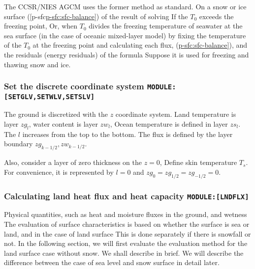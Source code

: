 The CCSR/NIES AGCM uses the former method as standard. On a snow or ice
surface
({[}p-sfc\protect\hyperlink{p-sfc:ux5cux2520sfc-balance}{p-sfc:sfc-balance{]}})
of the result of solving If the \(T_0\) exceeds the freezing point, Or,
when \(T_0\) divides the freezing temperature of seawater at the sea
surface (in the case of oceanic mixed-layer model) by fixing the
temperature of the \(T_0\) at the freezing point and calculating each
flux, (\protect\hyperlink{p-sfc:sfc-balance}{p-sfc:sfc-balance{]}}), and
the residuals (energy residuals) of the formula Suppose it is used for
freezing and thawing snow and ice.

\hypertarget{set-the-discrete-coordinate-system-modulesetglvsetwlvsetslv}{%
\subsubsection{\texorpdfstring{Set the discrete coordinate system
\texttt{MODULE:{[}SETGLV,SETWLV,SETSLV{]}}}{Set the discrete coordinate system MODULE:{[}SETGLV,SETWLV,SETSLV{]}}}\label{set-the-discrete-coordinate-system-modulesetglvsetwlvsetslv}}

The ground is discretized with the \(z\) coordinate system. Land
temperature is layer \(zg_l\), water content is layer \(zw_l\), Ocean
temperature is defined in layer \(zs_l\). The \(l\) increases from the
top to the bottom. The flux is defined by the layer boundary
\(zg_{k-1/2}, zw_{k-1/2}\).

Also, consider a layer of zero thickness on the \(z=0\), Define skin
temperature \(T_s\). For convenience, it is represented by \(l=0\) and
\(zg_{0} = zg_{1/2} = zg_{-1/2} = 0\).

\hypertarget{calculating-land-heat-flux-and-heat-capacity-modulelndflx}{%
\subsubsection{\texorpdfstring{Calculating land heat flux and heat
capacity
\texttt{MODULE:{[}LNDFLX{]}}}{Calculating land heat flux and heat capacity MODULE:{[}LNDFLX{]}}}\label{calculating-land-heat-flux-and-heat-capacity-modulelndflx}}

Physical quantities, such as heat and moisture fluxes in the ground, and
wetness The evaluation of surface characteristics is based on whether
the surface is sea or land, and in the case of land surface This is done
separately if there is snowfall or not. In the following section, we
will first evaluate the evaluation method for the land surface case
without snow. We shall describe in brief. We will describe the
difference between the case of sea level and snow surface in detail
later.


